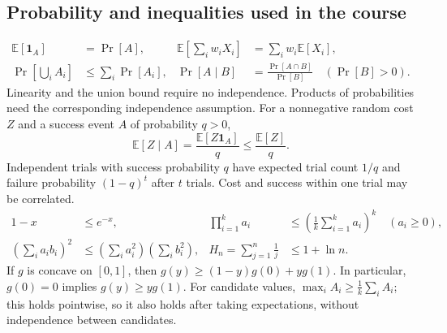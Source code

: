 \documentclass[10pt]{article}
\theoremstyle{definition}
\begin{document}
\subsection{Probability and inequalities used in the course}
\begin{align*}
\mathbb E[\mathbf1_A]&=\Pr[A], &
\mathbb E\!\left[\sum_iw_iX_i\right]&=\sum_iw_i\mathbb E[X_i],\\
\Pr\!\left[\bigcup_i A_i\right]&\le\sum_i\Pr[A_i], &
\Pr[A\mid B]&=\frac{\Pr[A\cap B]}{\Pr[B]}\quad(\Pr[B]>0).
\end{align*}
Linearity and the union bound require no independence. Products of probabilities need
the corresponding independence assumption. For a nonnegative random cost $Z$ and a success
event $A$ of probability $q>0$,
\[
\mathbb E[Z\mid A]=\frac{\mathbb E[Z\mathbf1_A]}q\le\frac{\mathbb E[Z]}q.
\]
Independent trials with success probability $q$ have expected trial count $1/q$ and
failure probability $(1-q)^t$ after $t$ trials. Cost and success within one trial may be correlated.
\begin{align*}
1-x&\le e^{-x}, &
\prod_{i=1}^k a_i&\le\left(\frac1k\sum_{i=1}^k a_i\right)^k\quad(a_i\ge0),\\
\left(\sum_i a_ib_i\right)^2&\le\left(\sum_i a_i^2\right)\left(\sum_i b_i^2\right), &
H_n=\sum_{j=1}^n\frac1j&\le1+\ln n.
\end{align*}
If $g$ is concave on $[0,1]$, then
$g(y)\ge(1-y)g(0)+yg(1)$. In particular, $g(0)=0$ implies $g(y)\ge yg(1)$.
For candidate values, $\max_i A_i\ge\frac1k\sum_i A_i$; this holds pointwise, so it also
holds after taking expectations, without independence between candidates.
\end{document}
